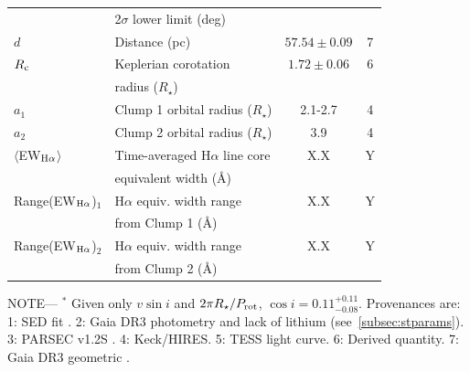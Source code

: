 \documentclass{nature3}
\begin{document}
\begin{table}
\begin{tabular}{llcc}
                                        & \hspace{3pt}  2$\sigma$ lower limit (deg)	                     &                      \\
%
$d$\dotfill                             & Distance (pc)\dotfill                                          & $57.54 \pm 0.09$   & 7 \\
%
$R_{\rm c}$\dotfill		                  & Keplerian corotation\dotfill                                   & $1.72 \pm 0.06$  & 6 \\
                                        & \hspace{3pt} radius ($R_\star$)	                               &                      \\
%
$a_1$\dotfill                           & Clump 1 orbital radius ($R_\star$)\hspace{9pt}\dotfill         &  2.1-2.7         & 4 \\
$a_2$\dotfill                           & Clump 2 orbital radius ($R_\star$)\hspace{9pt}\dotfill         &  3.9             & 4 \\
%
$\langle$EW$_{\rm H\alpha}$$\rangle$    & Time-averaged H$\alpha$ line core                              &  X.X             & Y \\ 
                                        & \hspace{3pt} equivalent width (\AA)	                           &                      \\
Range(EW$_{\rm H\alpha}$)$_1$           & H$\alpha$ equiv. width range                                   &  X.X             & Y \\ 
                                        & \hspace{3pt} from Clump 1 (\AA)	                               &                      \\
Range(EW$_{\rm H\alpha}$)$_2$           & H$\alpha$ equiv. width range                                   &  X.X             & Y \\ 
                                        & \hspace{3pt} from Clump 2 (\AA)	                               &                      \\
\hline
\end{tabular}
\begin{flushleft}
\footnotesize{ \textsc{NOTE}---
$^*$ Given only $v\sin i$ and $2\pi R_\star/P_{\rm rot}$, $\cos i=0.11^{+0.11}_{-0.08}$.
Provenances are:
1: SED fit \cite{Bouma2024}.
2: Gaia DR3 photometry and lack of lithium (see~\ref{subsec:stparams}).
3: PARSEC v1.2S \cite{Chen2014}.
4: Keck/HIRES.
5: TESS light curve.
6: Derived quantity.
7: Gaia DR3 geometric \cite{GaiaDR3}.
}
\end{flushleft}
\vspace{-0.5cm}
\end{table}
\end{document}
